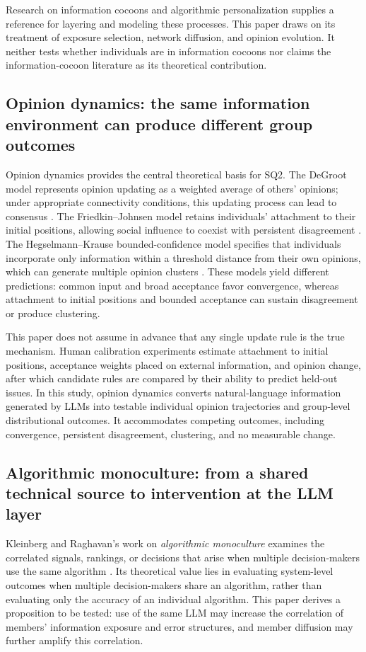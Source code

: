 \documentclass[11pt,a4paper]{article}
\newcommand{\term}[1]{\textit{#1}}
\begin{document}
Research on information cocoons and algorithmic personalization supplies a reference for layering and modeling these processes. This paper draws on its treatment of exposure selection, network diffusion, and opinion evolution. It neither tests whether individuals are in information cocoons nor claims the information-cocoon literature as its theoretical contribution.

\subsection{Opinion dynamics: the same information environment can produce different group outcomes}

Opinion dynamics provides the central theoretical basis for SQ2. The DeGroot model represents opinion updating as a weighted average of others' opinions; under appropriate connectivity conditions, this updating process can lead to consensus \cite{degroot1974}. The Friedkin--Johnsen model retains individuals' attachment to their initial positions, allowing social influence to coexist with persistent disagreement \cite{friedkin1990}. The Hegselmann--Krause bounded-confidence model specifies that individuals incorporate only information within a threshold distance from their own opinions, which can generate multiple opinion clusters \cite{hegselmann2002}. These models yield different predictions: common input and broad acceptance favor convergence, whereas attachment to initial positions and bounded acceptance can sustain disagreement or produce clustering.

This paper does not assume in advance that any single update rule is the true mechanism. Human calibration experiments estimate attachment to initial positions, acceptance weights placed on external information, and opinion change, after which candidate rules are compared by their ability to predict held-out issues. In this study, opinion dynamics converts natural-language information generated by LLMs into testable individual opinion trajectories and group-level distributional outcomes. It accommodates competing outcomes, including convergence, persistent disagreement, clustering, and no measurable change.

\subsection{Algorithmic monoculture: from a shared technical source to intervention at the LLM layer}

Kleinberg and Raghavan's work on \term{algorithmic monoculture} examines the correlated signals, rankings, or decisions that arise when multiple decision-makers use the same algorithm \cite{kleinberg2021}. Its theoretical value lies in evaluating system-level outcomes when multiple decision-makers share an algorithm, rather than evaluating only the accuracy of an individual algorithm. This paper derives a proposition to be tested: use of the same LLM may increase the correlation of members' information exposure and error structures, and member diffusion may further amplify this correlation.
\end{document}
